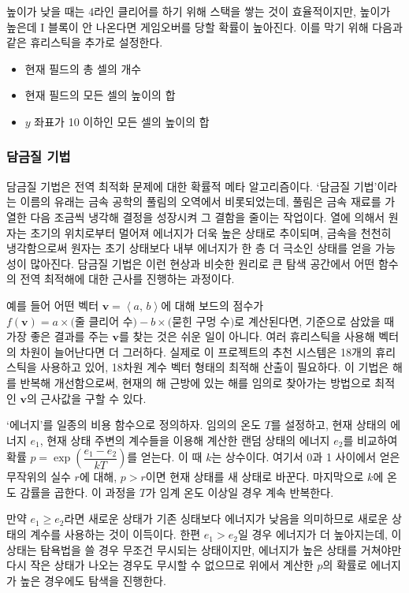 높이가 낮을 때는 4라인 클리어를 하기 위해 스택을 쌓는 것이 효율적이지만, 높이가 높은데 I 블록이 안 나온다면 게임오버를 당할 확률이 높아진다.
이를 막기 위해 다음과 같은 휴리스틱을 추가로 설정한다.

\begin{itemize}
    \item 현재 필드의 총 셀의 개수
    \item 현재 필드의 모든 셀의 높이의 합
    \item $y$ 좌표가 10 이하인 모든 셀의 높이의 합
\end{itemize}

\subsubsection{담금질 기법} 담금질 기법은 전역 최적화 문제에 대한 확률적 메타 알고리즘이다. `담금질 기법'이라는 이름의 유래는
금속 공학의 풀림의 오역에서 비롯되었는데, 풀림은 금속 재료를 가열한 다음 조금씩 냉각해 결정을 성장시켜 그 결함을 줄이는 작업이다.
열에 의해서 원자는 초기의 위치로부터 멀어져 에너지가 더욱 높은 상태로 추이되며, 금속을 천천히 냉각함으로써 원자는 초기 상태보다 내부 에너지가 한 층 더 극소인 상태를
얻을 가능성이 많아진다. 담금질 기법은 이런 현상과 비슷한 원리로 큰 탐색 공간에서 어떤 함수의 전역 최적해에 대한 근사를 진행하는 과정이다.\cite{1981Khachaturyan}

예를 들어 어떤 벡터 $\mathbf{v} = \left<a,\,b\right>$에 대해 보드의 점수가
$f\left(\mathbf{v}\right) = a\times\mbox{(줄 클리어 수)} - b\times\mbox{(묻힌 구멍 수)}$로 계산된다면, 기준으로 삼았을 때 가장 좋은 결과를 주는 $\mathbf{v}$를 찾는 것은 쉬운 일이 아니다.
여러 휴리스틱을 사용해 벡터의 차원이 늘어난다면 더 그러하다. 실제로 이 프로젝트의 추천 시스템은 18개의 휴리스틱을 사용하고 있어, 18차원 계수 벡터 형태의 최적해 산출이 필요하다.
이 기법은 해를 반복해 개선함으로써, 현재의 해 근방에 있는 해를 임의로 찾아가는 방법으로 최적인 $\mathbf{v}$의 근사값을 구할 수 있다.

`에너지'를 일종의 비용 함수으로 정의하자. 임의의 온도 $T$를 설정하고, 현재 상태의 에너지 $e_1$, 현재 상태 주변의 계수들을 이용해 계산한
랜덤 상태의 에너지 $e_2$를 비교하여 확률 $p=\exp \left(\dfrac{e_1-e_2}{kT}\right)$를 얻는다.
이 때 $k$는 상수이다. 여기서 0과 1 사이에서 얻은 무작위의 실수 $r$에 대해, $p>r$이면 현재 상태를 새 상태로 바꾼다. 마지막으로 $k$에 온도 감률을 곱한다. 이 과정을 $T$가 임계 온도 이상일 경우 계속 반복한다.

만약 $e_1 \geq e_2$라면 새로운 상태가 기존 싱태보다 에너지가 낮음을 의미하므로 새로운 상태의 계수를 사용하는 것이 이득이다. 한편 $e_1 > e_2$일 경우 에너지가 더 높아지는데,
이 상태는 탐욕법을 쓸 경우 무조건 무시되는 상태이지만, 에너지가 높은 상태를 거쳐야만 다시 작은 상태가 나오는 경우도 무시할 수 없으므로
위에서 계산한 $p$의 확률로 에너지가 높은 경우에도 탐색을 진행한다.
